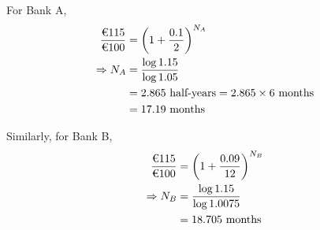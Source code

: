 \begin{solution}[\fullpage]
	For Bank A,
	\begin{align}
		\dfrac{\text{\texteuro 115}}{\text{\texteuro 100}} &= \left(1+\dfrac{0.1}{2}\right)^{N_A} \\
		\Rightarrow N_A &= \dfrac{\log 1.15}{\log 1.05} \\
		                &= 2.865\text{ half-years} = 2.865\times\text{6 months} \\
		                &= 17.19\text{ months}
	\end{align}
	
	Similarly, for Bank B,
	\begin{align}
		\dfrac{\text{\texteuro 115}}{\text{\texteuro 100}} &= \left(1+\dfrac{0.09}{12}\right)^{N_B} \\
		\Rightarrow N_B &= \dfrac{\log 1.15}{\log 1.0075} \\
		                &= 18.705\text{ months}
	\end{align}
	
	
\end{solution}
